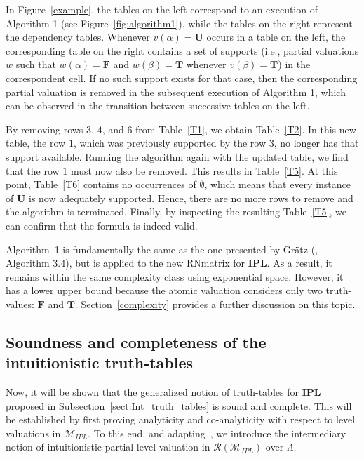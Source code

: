 \documentclass[12pt]{article}
\newcommand{\bT}{\mathbf{T}}
\newcommand{\bU}{\mathbf{U}}
\newcommand{\bF}{\mathbf{F}}
\newcommand{\ipl}{\ensuremath{\mathbf{IPL}}}
\begin{document}
In Figure~\ref{example}, the tables on the left correspond to an execution of Algorithm 1 (see Figure~\ref{fig:algorithm1}), while the tables on the right represent the dependency tables. Whenever $v(\alpha)=\bU$ occurs in a table on the left, the corresponding table on the right contains a set of supports (i.e., partial valuations $w$ such that $w(\alpha) = \bF$ and $w(\beta) = \bT$ whenever $v(\beta) = \bT$) in the correspondent cell. If no such support exists for that case, then the corresponding partial valuation is removed in the subsequent execution of Algorithm 1, which can be observed in the transition between successive tables on the left.

By removing rows $3$, $4$, and $6$ from Table~\ref{T1}, we obtain Table~\ref{T2}. In this new table, the row $1$, which was previously supported by the row $3$, no longer has that support available. Running the algorithm again with the updated table, we find that the row $1$ must now also be removed. This results in Table~\ref{T5}. At this point, Table~\ref{T6} contains no occurrences of $\emptyset$, which means that every instance of $\bU$ is now adequately supported. Hence, there are no more rows to remove and the algorithm is terminated. Finally, by inspecting the resulting Table~\ref{T5}, we can confirm that the formula is indeed valid.

Algorithm~1 is fundamentally the same as the one presented by Gr\"atz (\cite{gratz_truth_2022}, Algorithm $3.4$), but is applied to the new RNmatrix for \ipl. As a result, it remains within the same complexity class using exponential space. However, it has a lower upper bound because the atomic valuation considers only two truth-values: $\bF$ and $\bT$. Section~\ref{complexity} provides a further discussion on this topic.

\subsection{Soundness and completeness of the intuitionistic truth-tables}

Now, it will be shown that the generalized notion of truth-tables for \textbf{IPL} proposed in Subsection~\ref{sect:Int_truth_tables} is sound and complete. This will be established by first proving analyticity and co-analyticity with respect to level valuations in $\mathcal{M}_{IPL}$. To this end, and adapting~\cite[Definition~3.12]{gratz_truth_2022}, we introduce the intermediary notion of intuitionistic partial level valuation in $\mathcal{R}(\mathcal{M}_{IPL})$ over $\Lambda$.
\end{document}
